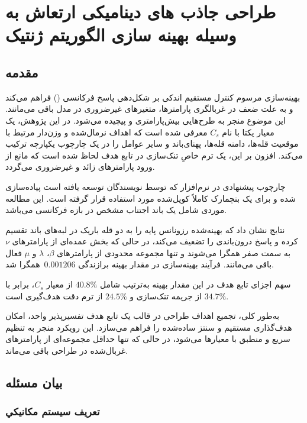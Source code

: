 \chapter{طراحی جاذب های دینامیکی ارتعاش به وسیله بهینه سازی الگوریتم ژنتیک}
\section{مقدمه}

بهینه‌سازی مرسوم  کنترل مستقیم اندکی بر شکل‌دهی پاسخ فرکانسی () فراهم می‌کند و به علت ضعف در غربالگری پارامترها، متغیرهای غیرضروری در مدل باقی می‌مانند. این موضوع منجر به طرح‌هایی بیش‌پارامتری و پیچیده می‌شود. در این پژوهش، یک معیار یکتا با نام \(C_s\) معرفی شده است که اهداف نرمال‌شده و وزن‌دار مرتبط با موقعیت قله‌ها، دامنه قله‌ها، پهنای‌باند و سایر عوامل را در یک چارچوب یکپارچه ترکیب می‌کند. افزون بر این، یک ترم خاصِ تنک‌سازی در تابع هدف لحاظ شده است که مانع از ورود پارامترهای زائد و غیرضروری می‌گردد. 

چارچوب پیشنهادی در نرم‌افزار  که توسط نویسندگان توسعه یافته است پیاده‌سازی شده و برای یک بنچمارک  کاملاً کوپل‌شده مورد استفاده قرار گرفته است. این مطالعه موردی شامل یک باند اجتناب مشخص در بازه فرکانسی  می‌باشد. 

نتایج نشان داد که  بهینه‌شده رزونانس پایه را به دو قله باریک در لبه‌های باند تقسیم کرده و پاسخ درون‌باندی را تضعیف می‌کند، در حالی که بخش عمده‌ای از پارامترهای \(\nu\) به سمت صفر همگرا می‌شوند و تنها مجموعه محدودی از پارامترهای \(\beta\)، \(\lambda\) و \(\mu\) فعال باقی می‌مانند. فرآیند بهینه‌سازی در مقدار بهینه برازندگی \(\,0.001206\) همگرا شد. 

سهم اجزای تابع هدف در این مقدار بهینه به‌ترتیب شامل $40.8\%$ از معیار \(C_s\)، برابر با $34.7\%$ از جریمه تنک‌سازی و $24.5\%$ از ترم دقت هدف‌گیری است. 

به‌طور کلی، تجمیع اهداف طراحی در قالب یک تابع هدف تفسیرپذیر واحد، امکان هدف‌گذاری مستقیم  و سنتز ساده‌شده  را فراهم می‌سازد. این رویکرد منجر به تنظیم سریع و منطبق با معیارها می‌شود، در حالی که تنها حداقل مجموعه‌ای از پارامترهای غربال‌شده در طراحی باقی می‌ماند.

\section{بيان مسئله}

\subsection{تعريف سيستم مكانيكي}

